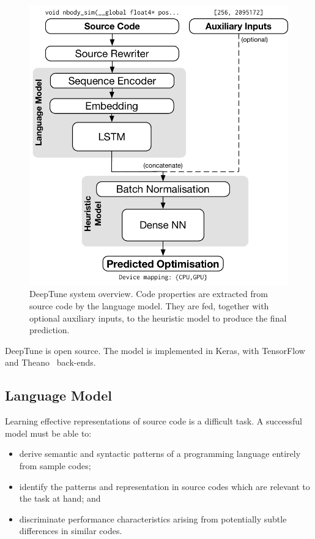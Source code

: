 \begin{figure}
  \centering
  \includegraphics[width=.85\columnwidth]{img/deeptune} %
  \caption[DeepTune system overview]{%
    DeepTune system overview. Code properties are extracted from source code by the
    language model. They are fed, together with optional auxiliary inputs, to
    the heuristic model to produce the final prediction.%
  }%
  \label{fig:deeptune}
\end{figure}

DeepTune is open source. The model is implemented in Keras, with TensorFlow~\cite{Abadi} and Theano~\cite{Bergstra2011} back-ends.


\subsection{Language Model}

Learning effective representations of source code is a difficult task. A successful model must be able to:

\begin{itemize}
  \item derive semantic and syntactic patterns of a programming language entirely from sample codes;
  \item identify the patterns and representation in source codes which are relevant to the task at hand; and
  \item discriminate performance characteristics arising from potentially subtle differences in similar codes.
\end{itemize}

